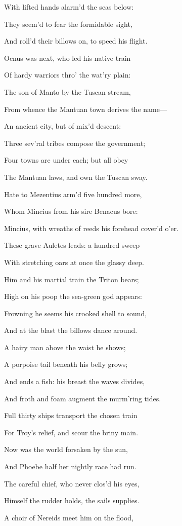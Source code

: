 With lifted hands alarm’d the seas below:

They seem’d to fear the formidable sight,

And roll’d their billows on, to speed his flight.

Ocnus was next, who led his native train

Of hardy warriors thro’ the wat’ry plain:

The son of Manto by the Tuscan stream,

From whence the Mantuan town derives the name—

An ancient city, but of mix’d descent:

Three sev’ral tribes compose the government;

Four towns are under each; but all obey

The Mantuan laws, and own the Tuscan sway.

Hate to Mezentius arm’d five hundred more,

Whom Mincius from his sire Benacus bore:

Mincius, with wreaths of reeds his forehead cover’d o’er.

These grave Auletes leads: a hundred sweep

With stretching oars at once the glassy deep.

Him and his martial train the Triton bears;

High on his poop the sea-green god appears:

Frowning he seems his crooked shell to sound,

And at the blast the billows dance around.

A hairy man above the waist he shows;

A porpoise tail beneath his belly grows;

And ends a fish: his breast the waves divides,

And froth and foam augment the murm’ring tides.

Full thirty ships transport the chosen train

For Troy’s relief, and scour the briny main.

Now was the world forsaken by the sun,

And Phoebe half her nightly race had run.

The careful chief, who never clos’d his eyes,

Himself the rudder holds, the sails supplies.

A choir of Nereids meet him on the flood,

